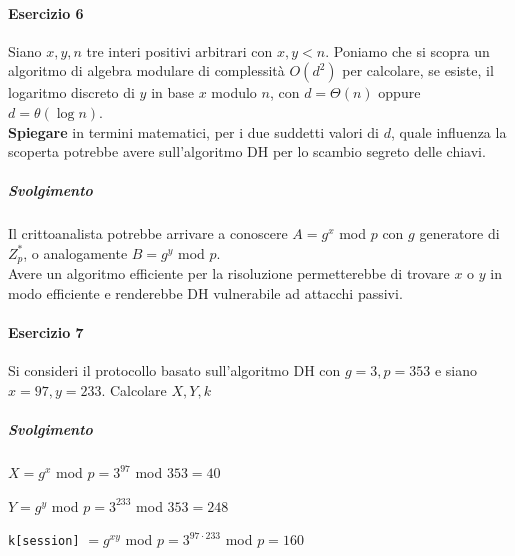 \documentclass[10pt]{book}
\begin{document}
\paragraph{Esercizio 6} Siano $x,y,n$ tre interi positivi arbitrari con $x,y < n$. Poniamo che si scopra un algoritmo di algebra modulare di complessità $O(d^2)$ per calcolare, se esiste, il logaritmo discreto di $y$ in base $x$ modulo $n$, con $d = \Theta(n)$ oppure $d = \theta(\log n)$.\\
\textbf{Spiegare} in termini matematici, per i due suddetti valori di $d$, quale influenza la scoperta potrebbe avere sull'algoritmo DH per lo scambio segreto delle chiavi.
\subparagraph{Svolgimento} Il crittoanalista potrebbe arrivare a conoscere $A = g^x$ mod $p$ con $g$ generatore di $Z_p^*$, o analogamente $B = g^y$ mod $p$.\\
Avere un algoritmo efficiente per la risoluzione permetterebbe di trovare $x$ o $y$ in modo efficiente e renderebbe DH vulnerabile ad attacchi passivi.
\paragraph{Esercizio 7} Si consideri il protocollo basato sull'algoritmo DH con $g=3, p=353$ e siano $x=97,y=233$. Calcolare $X,Y,k$
\subparagraph{Svolgimento}
\begin{list}{}{}
	\item $X = g^x$ mod $p = 3^{97}$ mod $353 = 40$
	\item $Y = g^y$ mod $p = 3^{233}$ mod $353 = 248$
	\item \texttt{k[session]} $= g^{xy}$ mod $p = 3^{97\cdot233}$ mod $p = 160$
\end{list}
\end{document}
